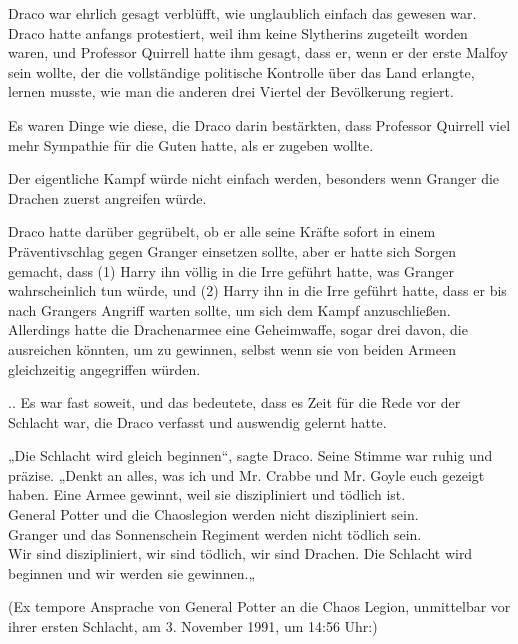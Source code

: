 {Draco war ehrlich gesagt verblüfft, wie unglaublich einfach das gewesen war. Draco hatte anfangs protestiert, weil ihm keine Slytherins zugeteilt worden waren, und Professor Quirrell hatte ihm gesagt, dass er, wenn er der erste Malfoy sein wollte, der die vollständige politische Kontrolle über das Land erlangte, lernen musste, wie man die anderen drei Viertel der Bevölkerung regiert.

Es waren Dinge wie diese, die Draco darin bestärkten, dass Professor Quirrell viel mehr Sympathie für die Guten hatte, als er zugeben wollte.

Der eigentliche Kampf würde nicht einfach werden, besonders wenn Granger die Drachen zuerst angreifen würde.

Draco hatte darüber gegrübelt, ob er alle seine Kräfte sofort in einem Präventivschlag gegen Granger einsetzen sollte, aber er hatte sich Sorgen gemacht, dass (1) Harry ihn völlig in die Irre geführt hatte, was Granger wahrscheinlich tun würde, und (2) Harry ihn in die Irre geführt hatte, dass er bis nach Grangers Angriff warten sollte, um sich dem Kampf anzuschließen.\\ Allerdings hatte die Drachenarmee eine Geheimwaffe, sogar drei davon, die ausreichen könnten, um zu gewinnen, selbst wenn sie von beiden Armeen gleichzeitig angegriffen würden.

.. Es war fast soweit, und das bedeutete, dass es Zeit für die Rede vor der Schlacht war, die Draco verfasst und auswendig gelernt hatte.

„Die Schlacht wird gleich beginnen“, sagte Draco. Seine Stimme war ruhig und präzise. „Denkt an alles, was ich und Mr. Crabbe und Mr. Goyle euch gezeigt haben. Eine Armee gewinnt, weil sie diszipliniert und tödlich ist.\\ General Potter und die Chaoslegion werden nicht diszipliniert sein.\\ Granger und das Sonnenschein Regiment werden nicht tödlich sein.\\ Wir sind diszipliniert, wir sind tödlich, wir sind Drachen. Die Schlacht wird beginnen und wir werden sie gewinnen.„

(Ex tempore Ansprache von General Potter an die Chaos Legion, unmittelbar vor ihrer ersten Schlacht, am 3. November 1991, um 14:56 Uhr:)

}
